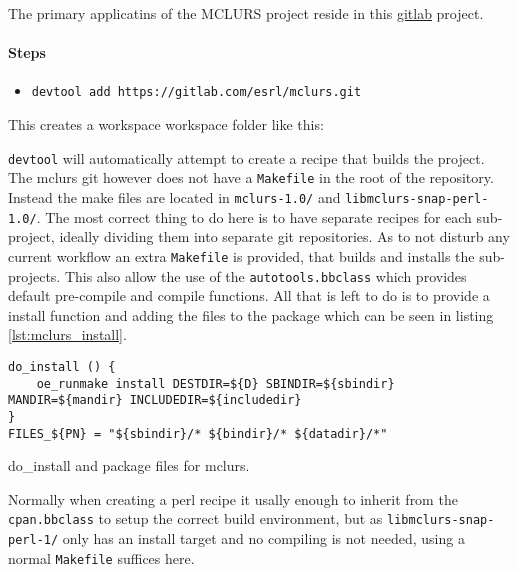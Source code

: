 \documentclass[../../main.tex]{subfiles}
\begin{document}
The primary applicatins of the MCLURS project reside in this
\href{https://gitlab.com/esrl/mclurs.git }{gitlab} project.


\paragraph{Steps}%
\label{par:steps}


\begin{itemize}
	\item \texttt{devtool add https://gitlab.com/esrl/mclurs.git}
\end{itemize}
This creates a workspace workspace folder like this:

\texttt{devtool} will automatically attempt to create a recipe that builds the project.
The mclurs git however does not have a \texttt{Makefile} in the root of the repository.
Instead the make files are located in \texttt{mclurs-1.0/} and
\texttt{libmclurs-snap-perl-1.0/}.
The most correct thing to do here is to have separate recipes for each sub-project, ideally
dividing them into separate git repositories.
As to not disturb any current workflow an extra \texttt{Makefile} is provided, that
builds and installs the sub-projects. This also allow the use of the
\texttt{autotools.bbclass} which provides default pre-compile and compile functions.
All that is left to do is to provide a install function and adding the files to the package which can be seen in listing \ref{lst:mclurs_install}.

\begin{listing}
\begin{verbatim}
do_install () {
	oe_runmake install DESTDIR=${D} SBINDIR=${sbindir} MANDIR=${mandir} INCLUDEDIR=${includedir}
}
FILES_${PN} = "${sbindir}/* ${bindir}/* ${datadir}/*"
\end{verbatim}
\caption{do\_install and package files for mclurs.}
\label{lst:mclurs_install}
\end{listing}

Normally when creating a perl recipe it usally enough to inherit from the
\texttt{cpan.bbclass} to setup the correct build environment, but as
\texttt{libmclurs-snap-perl-1/} only has an install target and no compiling
is not needed, using a normal \texttt{Makefile} suffices here.\\
\end{document}

